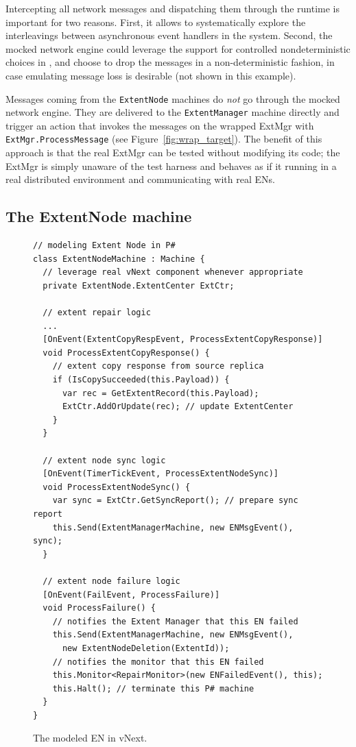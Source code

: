 Intercepting all network messages and dispatching them through the \psharp runtime is important for two reasons. First, it allows \psharp to systematically explore the interleavings between asynchronous event handlers in the system. Second, the mocked network engine could leverage the support for controlled nondeterministic choices in \psharp, and choose to drop the messages in a non-deterministic fashion, in case emulating message loss is desirable (not shown in this example).

Messages coming from the \texttt{ExtentNode} machines do \emph{not} go through the mocked network engine. They are delivered to the \texttt{ExtentManager} machine directly and trigger an action that invokes the messages on the wrapped ExtMgr with \texttt{ExtMgr.ProcessMessage} (see Figure~\ref{fig:wrap_target}). The benefit of this approach is that the real ExtMgr can be tested without modifying its code; the ExtMgr is simply unaware of the \psharp test harness and behaves as if it running in a real distributed environment and communicating with real ENs.

\subsection{The ExtentNode machine}
\label{sec:method:mock_en}

\begin{figure}[t]
\begin{lstlisting}
// modeling Extent Node in P#
class ExtentNodeMachine : Machine {
  // leverage real vNext component whenever appropriate
  private ExtentNode.ExtentCenter ExtCtr;

  // extent repair logic
  ...
  [OnEvent(ExtentCopyRespEvent, ProcessExtentCopyResponse)]
  void ProcessExtentCopyResponse() {
    // extent copy response from source replica
    if (IsCopySucceeded(this.Payload)) {
      var rec = GetExtentRecord(this.Payload);
      ExtCtr.AddOrUpdate(rec); // update ExtentCenter
    }
  }

  // extent node sync logic
  [OnEvent(TimerTickEvent, ProcessExtentNodeSync)]
  void ProcessExtentNodeSync() {
    var sync = ExtCtr.GetSyncReport(); // prepare sync report
    this.Send(ExtentManagerMachine, new ENMsgEvent(), sync);
  }
  
  // extent node failure logic
  [OnEvent(FailEvent, ProcessFailure)]
  void ProcessFailure() {
    // notifies the Extent Manager that this EN failed
    this.Send(ExtentManagerMachine, new ENMsgEvent(),
      new ExtentNodeDeletion(ExtentId));
    // notifies the monitor that this EN failed
    this.Monitor<RepairMonitor>(new ENFailedEvent(), this);
    this.Halt(); // terminate this P# machine
  }
}
\end{lstlisting}
\vspace{-3mm}
\caption{The modeled EN in vNext.}
\label{fig:mocked_en}
\vspace{-2mm}
\end{figure}

